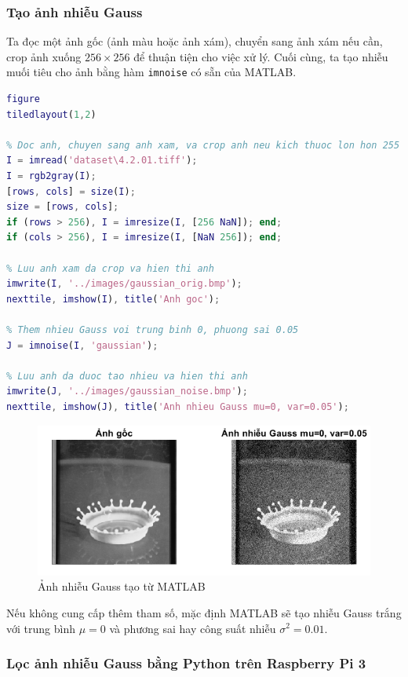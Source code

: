 \subsubsection{Tạo ảnh nhiễu Gauss}

Ta đọc một ảnh gốc (ảnh màu hoặc ảnh xám), chuyển sang ảnh xám nếu cần, crop ảnh xuống $256 \times 256$ để thuận tiện cho việc xử lý. Cuối cùng, ta tạo nhiễu muối tiêu cho ảnh bằng hàm \texttt{imnoise} có sẵn của MATLAB.

\begin{lstlisting}[language=MATLAB]
figure
tiledlayout(1,2)

% Doc anh, chuyen sang anh xam, va crop anh neu kich thuoc lon hon 255
I = imread('dataset\4.2.01.tiff');
I = rgb2gray(I);
[rows, cols] = size(I);
size = [rows, cols];
if (rows > 256), I = imresize(I, [256 NaN]); end;
if (cols > 256), I = imresize(I, [NaN 256]); end;

% Luu anh xam da crop va hien thi anh
imwrite(I, '../images/gaussian_orig.bmp');
nexttile, imshow(I), title('Anh goc');

% Them nhieu Gauss voi trung binh 0, phuong sai 0.05
J = imnoise(I, 'gaussian');

% Luu anh da duoc tao nhieu va hien thi anh
imwrite(J, '../images/gaussian_noise.bmp');
nexttile, imshow(J), title('Anh nhieu Gauss mu=0, var=0.05');
\end{lstlisting}

\begin{figure}[H]
    \centering
    \includegraphics[width=.75\linewidth]{../images/gaussian_noise_matlab.png}
    \caption{Ảnh nhiễu Gauss tạo từ MATLAB}
    \label{fig:gaussian_noise_matlab}
\end{figure}

Nếu không cung cấp thêm tham số, mặc định MATLAB sẽ tạo nhiễu Gauss trắng với trung bình $\mu = 0$ và phương sai hay công suất nhiễu $\sigma^2 = 0.01$.

\subsubsection{Lọc ảnh nhiễu Gauss bằng Python trên Raspberry Pi 3}

